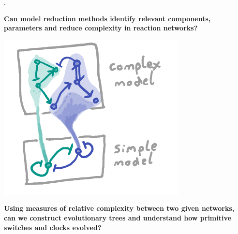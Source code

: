 \documentclass[a0,portrait]{a0poster}
\begin{document}
\cite{DanielsSloppinessBiology}.
\medbreak
\begin{tcolorbox}[boxrule=2pt,arc=3.4pt,boxsep=2mm]
\begin{center}\color{DarkRed}
\textbf{Can model reduction methods \cite{Cardelli2016NoiseSwitches} identify relevant components,
parameters and reduce complexity in reaction networks?}
\end{center}
\end{tcolorbox}
\begin{center}
\includegraphics[width=0.9\linewidth]{reduction}
\end{center}
\begin{tcolorbox}[boxrule=2pt,arc=3.4pt,boxsep=2mm]
\begin{center}\color{DarkRed}
\textbf{Using measures of relative complexity between two given networks,
can we construct evolutionary trees and understand how primitive switches
and clocks evolved?}
\end{center}
\end{tcolorbox}
\vfill\null
\columnbreak
\end{document}
